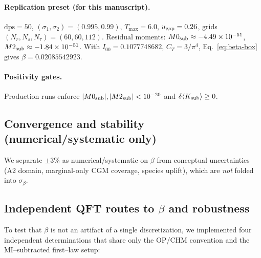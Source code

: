 \documentclass[aps,prd,onecolumn,superscriptaddress,nofootinbib]{revtex4-2}
\begin{document}
\paragraph*{Replication preset (for this manuscript).}
$\mathrm{dps}=50$, $(\sigma_1,\sigma_2)=(0.995,0.99)$, $T_{\max}=6.0$, $u_{\rm gap}=0.26$, grids $(N_r,N_s,N_\tau)=(60,60,112)$. Residual moments: $M0_{\rm sub}\approx-4.49\times 10^{-51}$, $M2_{\rm sub}\approx-1.84\times 10^{-51}$. With $I_{00}=0.1077748682$, $C_T=3/\pi^4$, Eq.~\eqref{eq:beta-box} gives $\beta=0.02085542923$.

\paragraph*{Positivity gates.}
Production runs enforce $|M0_{\rm sub}|,|M2_{\rm sub}|<10^{-20}$ and $\delta\langle K_{\rm sub}\rangle \ge 0$.

\subsection{Convergence and stability (numerical/systematic only)}
\label{sec:convergence}
We separate $\pm3\%$ as numerical/systematic on $\beta$ from conceptual uncertainties (A2 domain, marginal-only CGM coverage, species uplift), which are \emph{not} folded into $\sigma_\beta$.

\subsection{Independent QFT routes to \texorpdfstring{$\beta$}{beta} and robustness}
\label{sec:beta-multimethod}
To test that $\beta$ is not an artifact of a single discretization, we implemented four independent determinations that share only the OP/CHM convention and the MI–subtracted first–law setup:
\end{document}
